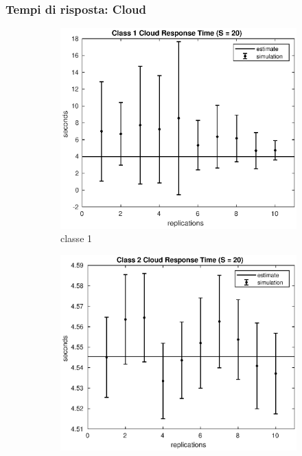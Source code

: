 \subsubsection{Tempi di risposta: Cloud}
%
\begin{figure}[!h]
\centering
%
\begin{subfigure}[t]{0.49\textwidth}
\includegraphics[width=\textwidth]{figures/simul/20_500K_s1cloud}
\caption{classe 1}
\label{20_s1cloud}
\end{subfigure}
%
\begin{subfigure}[t]{0.49\textwidth}
\includegraphics[width=\textwidth]{figures/simul/20_500K_s2cloud}

\end{subfigure}
\end{figure}
